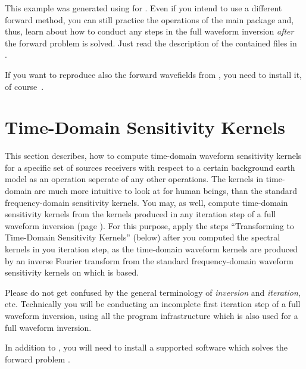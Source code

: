 This example was generated using  for \ASKI{}. Even if you intend
to use a different forward method, you can still practice the operations of the main \ASKI{}
package and, thus, learn about how to conduct any steps in
the full waveform inversion \emph{after} the forward problem is solved. Just read the description
of the contained files in \\
.

If you want to reproduce also the forward wavefields from , 
you need to install it, of course~.
%
%
\newpage
\section*{Time-Domain Sensitivity Kernels} \label{guide,sec:time_kernels}
%
%
This section describes, how to compute time-domain waveform sensitivity kernels for a specific set 
of sources receivers with respect to a certain background earth model as an operation seperate of any
other \ASKI{} operations. The kernels in time-domain are much more intuitive to look at for human beings, 
than the standard frequency-domain sensitivity kernels. You may, as well, compute time-domain sensitivity 
kernels from the kernels produced in any iteration step of a full waveform inversion 
(page \pageref{guide,sec:classic_inversion}). For this purpose, apply the steps 
``Transforming to Time-Domain Sensitivity Kernels'' (below) after you computed the spectral kernels in 
you iteration step, as the time-domain waveform kernels are produced by an inverse Fourier transform 
from the standard frequency-domain waveform sensitivity kernels on which \ASKI{} is based.

Please do not get confused by the general terminology of \emph{inversion} and \emph{iteration}, etc. 
Technically you will be conducting an incomplete first iteration step of a full waveform inversion, 
using all the program infrastructure which is also used for a full waveform inversion. 

In addition to \ASKI{} , you will need to install a supported software which 
solves the forward problem .
%
